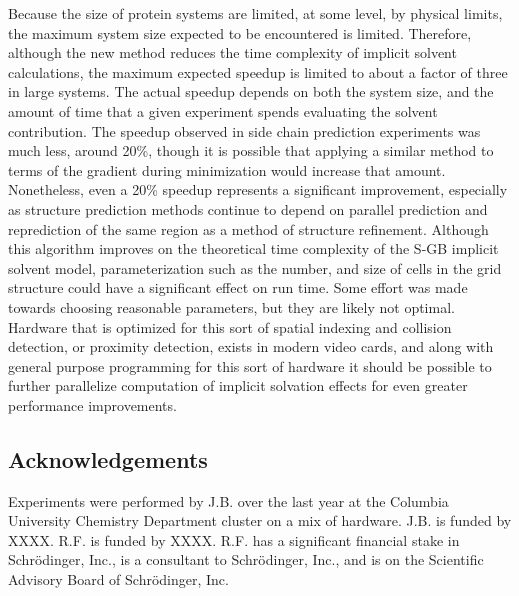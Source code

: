 Because the size of protein systems are limited, at some level, by physical limits, the maximum system size expected to be encountered is limited.
Therefore, although the new method reduces the time complexity of implicit solvent calculations, the maximum expected speedup is limited to about a factor of three in large systems.
The actual speedup depends on both the system size, and the amount of time that a given experiment spends evaluating the solvent contribution.
The speedup observed in side chain prediction experiments was much less, around 20\%, though it is possible that applying a similar method to terms of the gradient during minimization would increase that amount.
Nonetheless, even a 20\%  speedup represents a significant improvement, especially as structure prediction methods continue to depend on parallel prediction and reprediction of the same region as a method of structure refinement\cite{goldfeld2013loop}.
Although this algorithm improves on the theoretical time complexity of the S-GB implicit solvent model, parameterization such as the number, and size of cells in the grid structure could have a significant effect on run time.
Some effort was made towards choosing reasonable parameters, but they are likely not optimal.
Hardware that is optimized for this sort of spatial indexing and collision detection, or proximity detection, exists in modern video cards, and along with general purpose programming for this sort of hardware it should be possible to further parallelize computation of implicit solvation effects for even greater performance improvements\cite{harris2008cuda}.

\subsection*{Acknowledgements}
\label{subsec:acknowledgements}
Experiments were performed by J.B. over the last year at the Columbia University Chemistry Department cluster on a mix of hardware. 
J.B. is funded by XXXX.
R.F. is funded by XXXX. R.F. has a significant financial stake in Schr\"{o}dinger, Inc., is a consultant to Schr\"{o}dinger, Inc., and is on the Scientific Advisory Board of Schr\"{o}dinger, Inc.

